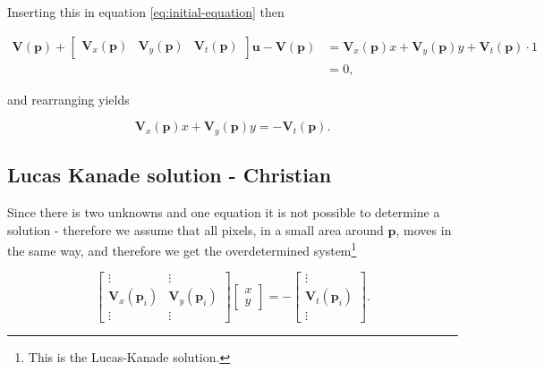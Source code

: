 \documentclass{article}
\begin{document}
Inserting this in equation \ref{eq:initial-equation} then

\begin{equation}
    \begin{split}
        \boldsymbol{V(p)} + \begin{bmatrix}
        \boldsymbol{V}_x(\boldsymbol{p}) & \boldsymbol{V}_y(\boldsymbol{p}) & \boldsymbol{V}_t(\boldsymbol{p})
        \end{bmatrix} \boldsymbol{u} - \boldsymbol{V(p)} &= \boldsymbol{V}_x(\boldsymbol{p}) x + \boldsymbol{V}_y(\boldsymbol{p}) y + \boldsymbol{V}_t(\boldsymbol{p}) \cdot 1 \\
        &= 0,
    \end{split}
\end{equation}

and rearranging yields

\begin{equation}
    \boldsymbol{V}_x(\boldsymbol{p}) x + \boldsymbol{V}_y(\boldsymbol{p}) y = -\boldsymbol{V}_t(\boldsymbol{p}).
\end{equation}

\subsection*{Lucas Kanade solution - Christian}

Since there is two unknowns and one equation it is not possible to determine a solution - therefore we assume that all pixels, in a small area around $\boldsymbol{p}$, moves in the same way, and therefore we get the overdetermined system\footnote{This is the Lucas-Kanade solution.}

\begin{equation}
    \begin{bmatrix}
        \vdots & \vdots \\
        \boldsymbol{V}_x(\boldsymbol{p}_i) & \boldsymbol{V}_y(\boldsymbol{p}_i) \\
        \vdots & \vdots
    \end{bmatrix} \begin{bmatrix}
        x \\ y
    \end{bmatrix}
    = - \begin{bmatrix}
        \vdots \\ \boldsymbol{V}_t(\boldsymbol{p}_i) \\ \vdots
    \end{bmatrix}.
\end{equation}
\end{document}

